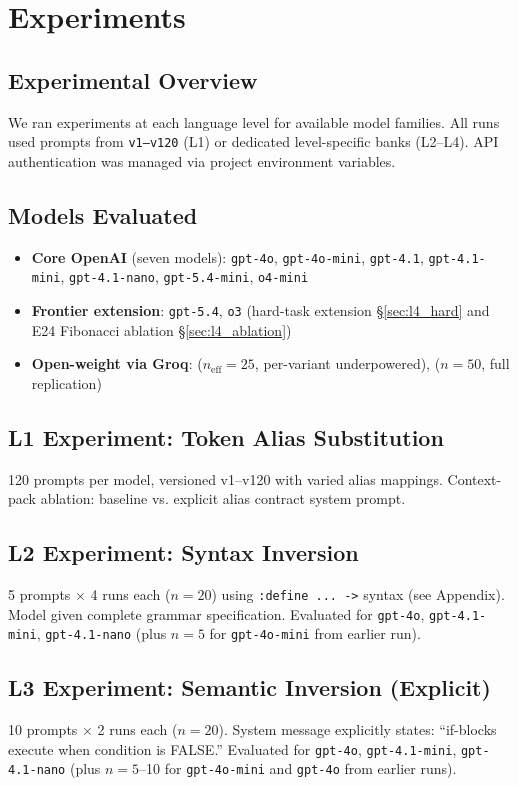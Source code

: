 \section{Experiments}
\subsection{Experimental Overview}
We ran experiments at each language level for available model families. All runs used prompts from \texttt{v1--v120} (L1) or dedicated level-specific banks (L2--L4). API authentication was managed via project environment variables.

\subsection{Models Evaluated}
\begin{itemize}
  \item \textbf{Core OpenAI} (seven models): \texttt{gpt-4o}, \texttt{gpt-4o-mini}, \texttt{gpt-4.1}, \texttt{gpt-4.1-mini}, \texttt{gpt-4.1-nano}, \texttt{gpt-5.4-mini}, \texttt{o4-mini}
  \item \textbf{Frontier extension}: \texttt{gpt-5.4}, \texttt{o3} (hard-task extension §\ref{sec:l4_hard} and E24 Fibonacci ablation §\ref{sec:l4_ablation})
  \item \textbf{Open-weight via Groq}: \llamaseventy{} ($n_\mathrm{eff}=25$, per-variant underpowered), \qwenthirtytwo{} ($n=50$, full replication)
\end{itemize}

\subsection{L1 Experiment: Token Alias Substitution}
120 prompts per model, versioned v1--v120 with varied alias mappings. Context-pack ablation: baseline vs. explicit alias contract system prompt.

\subsection{L2 Experiment: Syntax Inversion}
5 prompts $\times$ 4 runs each ($n=20$) using \texttt{:define ... ->} syntax (see Appendix). Model given complete grammar specification. Evaluated for \texttt{gpt-4o}, \texttt{gpt-4.1-mini}, \texttt{gpt-4.1-nano} (plus $n=5$ for \texttt{gpt-4o-mini} from earlier run).

\subsection{L3 Experiment: Semantic Inversion (Explicit)}
10 prompts $\times$ 2 runs each ($n=20$). System message explicitly states: ``if-blocks execute when condition is FALSE.'' Evaluated for \texttt{gpt-4o}, \texttt{gpt-4.1-mini}, \texttt{gpt-4.1-nano} (plus $n=5$--10 for \texttt{gpt-4o-mini} and \texttt{gpt-4o} from earlier runs).

